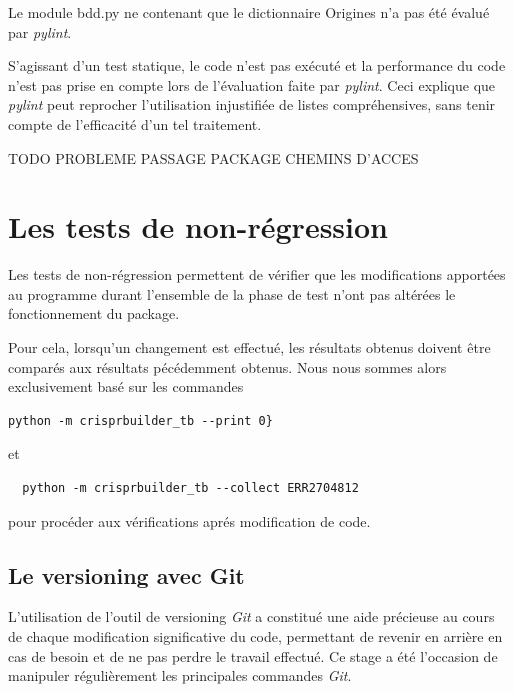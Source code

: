 \documentclass[twoside,a4paper,11pt,frenchb,openany]{report}
\begin{document}
Le module bdd.py ne contenant que le dictionnaire Origines n'a pas été évalué par \textit{pylint}.

S'agissant d'un test statique, le code n'est pas exécuté et la performance du code n'est pas prise en compte lors de l'évaluation faite par \textit{pylint}. Ceci explique que \textit{pylint} peut reprocher l'utilisation injustifiée de listes compréhensives, sans tenir compte de l'efficacité d'un tel traitement.

TODO PROBLEME PASSAGE PACKAGE
CHEMINS D'ACCES




\section{Les tests de non-régression}

Les tests de non-régression permettent de vérifier que les modifications apportées au programme durant l'ensemble de la phase de test n'ont pas altérées le fonctionnement du package.

Pour cela, lorsqu'un changement est effectué, les résultats obtenus doivent être comparés aux résultats pécédemment obtenus. Nous nous sommes alors exclusivement basé sur les commandes

\begin{verbatim}python -m crisprbuilder_tb --print 0}\end{verbatim}

et 

\begin{verbatim}  python -m crisprbuilder_tb --collect ERR2704812\end{verbatim}

pour procéder aux vérifications aprés modification de code.



\subsection{Le versioning avec Git}

L'utilisation de l'outil de versioning \textit{Git} a constitué une aide précieuse au cours de chaque modification significative du code, permettant de revenir en arrière en cas de besoin et de ne pas perdre le travail effectué. Ce stage a été l'occasion de manipuler régulièrement les principales commandes \textit{Git}. 
\end{document}
